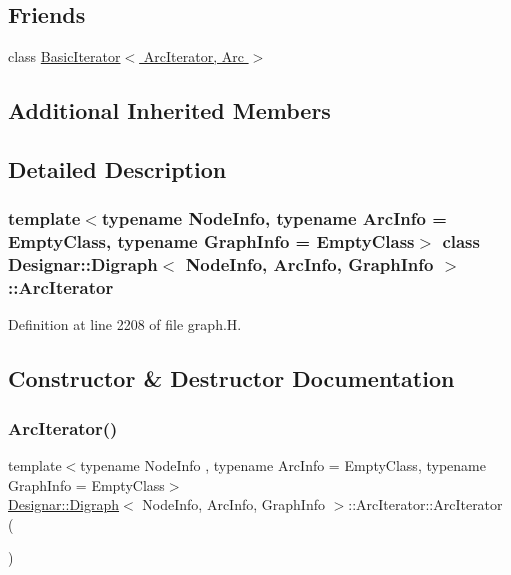 \subsection*{Friends}
\begin{DoxyCompactItemize}
\item 
class \hyperlink{class_designar_1_1_digraph_1_1_arc_iterator_a530ad7c7218fa9b74a5cce004d0e3a1c}{Basic\+Iterator$<$ Arc\+Iterator, Arc $>$}
\end{DoxyCompactItemize}
\subsection*{Additional Inherited Members}


\subsection{Detailed Description}
\subsubsection*{template$<$typename Node\+Info, typename Arc\+Info = Empty\+Class, typename Graph\+Info = Empty\+Class$>$\newline
class Designar\+::\+Digraph$<$ Node\+Info, Arc\+Info, Graph\+Info $>$\+::\+Arc\+Iterator}



Definition at line 2208 of file graph.\+H.



\subsection{Constructor \& Destructor Documentation}
\mbox{\label{class_designar_1_1_digraph_1_1_arc_iterator_a0f540c556301e1d4e0a9d48433257b89}} 
\subsubsection{\texorpdfstring{Arc\+Iterator()}{ArcIterator()}\hspace{0.1cm}{\footnotesize\ttfamily [1/5]}}
{\footnotesize\ttfamily template$<$typename Node\+Info , typename Arc\+Info  = Empty\+Class, typename Graph\+Info  = Empty\+Class$>$ \\
\hyperlink{class_designar_1_1_digraph}{Designar\+::\+Digraph}$<$ Node\+Info, Arc\+Info, Graph\+Info $>$\+::Arc\+Iterator\+::\+Arc\+Iterator (\begin{DoxyParamCaption}{ }\end{DoxyParamCaption})\hspace{0.3cm}{\ttfamily [inline]}}



